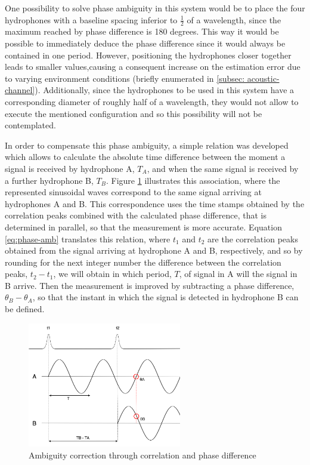 One possibility to solve phase ambiguity in this system would be to place the four hydrophones with a baseline spacing inferior to $\frac{1}{2}$ of a wavelength, since the maximum reached by phase difference is 180 degrees. This way it would be possible to immediately deduce the phase difference since it would always be contained in one period. However, positioning the hydrophones closer together leads to smaller  values,causing a consequent increase on the estimation error due to varying environment conditions (briefly enumerated in \ref{subsec: acoustic-channel}). Additionally, since the hydrophones to be used in this system have a corresponding diameter of roughly half of a wavelength, they would not allow to execute the mentioned configuration and so this possibility will not be contemplated.

In order to compensate this phase ambiguity, a simple relation was developed which allows to calculate the absolute time difference between the moment a signal is received by hydrophone A, $T_A$, and when the same signal is received by a further hydrophone B, $T_B$. Figure \ref{fig:ambiguity} illustrates this association, where the represented sinusoidal waves correspond to the same signal arriving at hydrophones A and B. This correspondence uses the time stamps obtained by the correlation peaks combined with the calculated phase difference, that is determined in parallel, so that the measurement is more accurate. Equation \ref{eq:phase-amb} translates this relation, where $t_1$ and $t_2$ are the correlation peaks obtained from the signal arriving at hydrophone A and B, respectively, and so by rounding for the next integer number the difference between the correlation peaks, $t_2 - t_1$, we will obtain in which period, $T$, of signal in A will the signal in B arrive. Then the measurement is improved by subtracting a phase difference, $\theta_B - \theta_A$, so that the instant in which the signal is detected in hydrophone B can be defined. 

\begin{figure}[!htbp]
	\centering
	\includegraphics[width=0.6\textwidth]{figures/ambiguity}
	\captionsetup{justification=centering,margin=2cm}
	\caption{Ambiguity correction through correlation and phase difference}
	\label{fig:ambiguity}
\end{figure}


